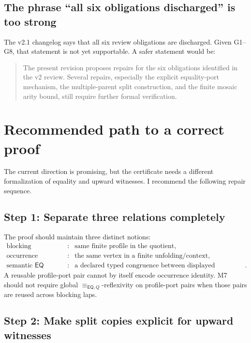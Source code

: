 \documentclass[11pt]{article}
\newcommand{\EQ}{\mathsf{EQ}}
\newcommand{\eqQ}{\equiv_{\EQ,Q}}
\begin{document}
\subsection{The phrase ``all six obligations discharged'' is too strong}

The v2.1 changelog says that all six review obligations are discharged.  Given
G1--G8, that statement is not yet supportable.  A safer statement would be:

\begin{quote}
The present revision proposes repairs for the six obligations identified in the
v2 review.  Several repairs, especially the explicit equality-port mechanism,
the multiple-parent split construction, and the finite mosaic arity bound, still
require further formal verification.
\end{quote}

\section{Recommended path to a correct proof}

The current direction is promising, but the certificate needs a different
formalization of equality and upward witnesses.  I recommend the following
repair sequence.

\subsection{Step 1: Separate three relations completely}

The proof should maintain three distinct notions:
\[
\begin{array}{rcl}
\text{blocking repetition} &:& \text{same finite profile in the quotient},\\
\text{occurrence identity} &:& \text{the same vertex in a finite unfolding/context},\\
\text{semantic }\EQ &:& \text{a declared typed congruence between displayed occurrences}.
\end{array}
\]
A reusable profile-port pair cannot by itself encode occurrence identity.  M7
should not require global \(\eqQ\)-reflexivity on profile-port pairs when those
pairs are reused across blocking laps.

\subsection{Step 2: Make split copies explicit for upward witnesses}
\end{document}
